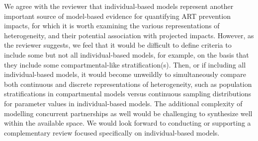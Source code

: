 \begin{response}
We agree with the reviewer that individual-based models represent
another important source of model-based evidence for quantifying ART prevention impacts,
for which it is worth examining the various representations of heterogeneity,
and their potential association with projected impacts.
However, as the reviewer suggests, we feel that it would be difficult to define
criteria to include some but not all individual-based models,
for example, on the basis that they include some compartmental-like stratification(s).
Then, or if including all individual-based models, it would become unweildly
to simultaneously compare both continuous and discrete representations of heterogeneity,
such as population stratifications in compartmental models versus
continuous sampling distributions for parameter values in individual-based models.
The additional complexity of modelling concurrent partnerships as well would be
challenging to synthesize well within the available space.
We would look forward to conducting or supporting a complementary review
focused specifically on individual-based models.
\end{response}

